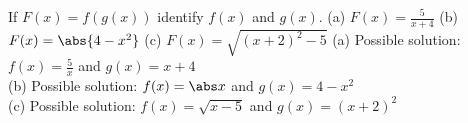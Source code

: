 {If $F(x) = f(g(x))$ identify $f(x)$ and $g(x)$.
(a) $F(x) = \frac5{x+4}$ \qquad (b) $F(x)=\abs{4-x^2}$ \qquad (c) $F(x)=\sqrt{(x+2)^2-5}$
}
{(a) Possible solution: $f(x)=\frac5{x}$ and $g(x)=x+4$ \\
(b) Possible solution: $f(x)=\abs x$ and $g(x)=4-x^2$ \\
(c) Possible solution: $f(x)=\sqrt{x-5}$ and $g(x)=(x+2)^2$}